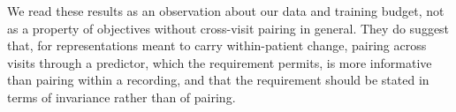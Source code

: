 We read these results as an observation about our data and training budget, not as a property of objectives without cross-visit pairing in general. They do suggest that, for representations meant to carry within-patient change, pairing across visits through a predictor, which the requirement permits, is more informative than pairing within a recording, and that the requirement should be stated in terms of invariance rather than of pairing.
